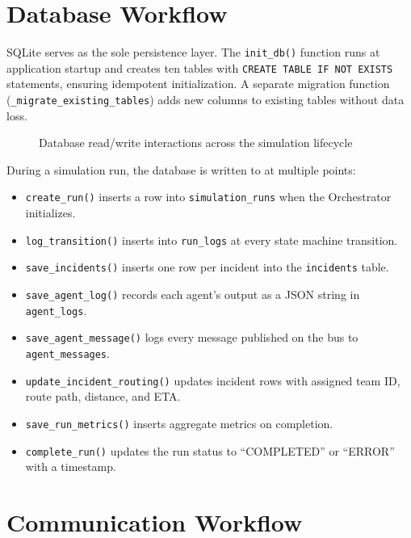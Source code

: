 \section{Database Workflow}
\label{sec:database_workflow}

SQLite serves as the sole persistence layer. The \texttt{init\_db()} function runs at application startup and creates ten tables with \texttt{CREATE TABLE IF NOT EXISTS} statements, ensuring idempotent initialization. A separate migration function (\texttt{\_migrate\_existing\_tables}) adds new columns to existing tables without data loss.

\begin{figure}[H]
\centering
{}
\caption{Database read/write interactions across the simulation lifecycle}
\label{fig:db_workflow}
\end{figure}

During a simulation run, the database is written to at multiple points:

\begin{itemize}[leftmargin=*]
    \item \texttt{create\_run()} inserts a row into \texttt{simulation\_runs} when the Orchestrator initializes.
    \item \texttt{log\_transition()} inserts into \texttt{run\_logs} at every state machine transition.
    \item \texttt{save\_incidents()} inserts one row per incident into the \texttt{incidents} table.
    \item \texttt{save\_agent\_log()} records each agent's output as a JSON string in \texttt{agent\_logs}.
    \item \texttt{save\_agent\_message()} logs every message published on the bus to \texttt{agent\_messages}.
    \item \texttt{update\_incident\_routing()} updates incident rows with assigned team ID, route path, distance, and ETA.
    \item \texttt{save\_run\_metrics()} inserts aggregate metrics on completion.
    \item \texttt{complete\_run()} updates the run status to ``COMPLETED'' or ``ERROR'' with a timestamp.
\end{itemize}

\section{Communication Workflow}
\label{sec:communication_workflow}

